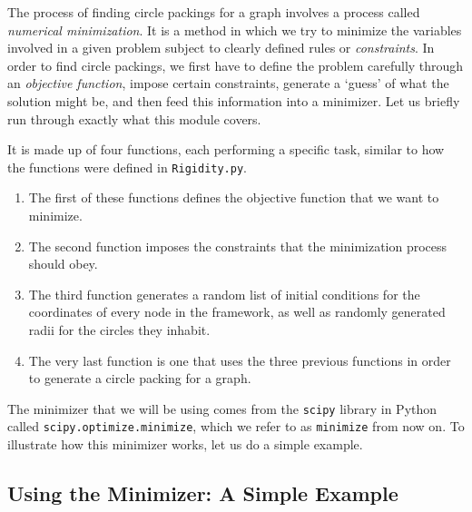 \begin{flushleft}
The process of finding circle packings for a graph involves a process called \textit{numerical minimization}. It is a method in which we try to minimize the variables involved in a given problem subject to clearly defined rules or \textit{constraints}. In order to find circle packings, we first have to define the problem carefully through an \textit{objective function}, impose certain constraints, generate a `guess' of what the solution might be, and then feed this information into a minimizer. Let us briefly run through exactly what this module covers. 
\end{flushleft}

\begin{flushleft}
It is made up of four functions, each performing a specific task, similar to how the functions were defined in \texttt{Rigidity.py}. 
\begin{enumerate}
    \item The first of these functions defines the objective function that we want to minimize.
    \vspace{-3mm}
    \item The second function imposes the constraints that the minimization process should obey. 
    \vspace{-3mm}
    \item The third function generates a random list of initial conditions for the coordinates of every node in the framework, as well as randomly generated radii for the circles they inhabit.
    \vspace{-3mm}
    \item The very last function is one that uses the three previous functions in order to generate a circle packing for a graph.
\end{enumerate}
\end{flushleft}

\begin{flushleft}
The minimizer that we will be using comes from the \texttt{scipy} \cite{scipy} library in Python called \texttt{scipy.optimize.minimize}, which we refer to as \texttt{minimize} from now on. To illustrate how this minimizer works, let us do a simple example.
\end{flushleft}

\subsection{Using the Minimizer: A Simple Example}

